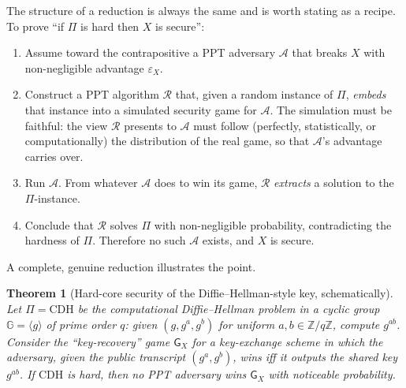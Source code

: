 \documentclass[11pt,a4paper]{article}
\newtheorem{theorem}{Theorem}[section]
\theoremstyle{definition}
\theoremstyle{remark}
\newcommand{\Z}{\ensuremath{\mathbb{Z}}}
\begin{document}
The structure of a reduction is always the same and is worth stating as a recipe.
To prove ``if \(\Pi\) is hard then \(X\) is secure'':

\begin{enumerate}
\item Assume toward the contrapositive a PPT adversary \(\mathcal{A}\) that breaks
  \(X\) with non-negligible advantage \(\varepsilon_X\).
\item Construct a PPT algorithm \(\mathcal{R}\) that, given a random instance of
  \(\Pi\), \emph{embeds} that instance into a simulated security game for
  \(\mathcal{A}\). The simulation must be faithful: the view \(\mathcal{R}\)
  presents to \(\mathcal{A}\) must follow (perfectly, statistically, or
  computationally) the distribution of the real game, so that \(\mathcal{A}\)'s advantage
  carries over.
\item Run \(\mathcal{A}\). From whatever \(\mathcal{A}\) does to win its game,
  \(\mathcal{R}\) \emph{extracts} a solution to the \(\Pi\)-instance.
\item Conclude that \(\mathcal{R}\) solves \(\Pi\) with non-negligible
  probability, contradicting the hardness of \(\Pi\). Therefore no such
  \(\mathcal{A}\) exists, and \(X\) is secure.
\end{enumerate}

A complete, genuine reduction illustrates the point.

\begin{theorem}[Hard-core security of the Diffie--Hellman-style key, schematically]\label{model:thm:reduction-example}
Let \(\Pi = \mathrm{CDH}\) be the computational Diffie--Hellman problem in a
cyclic group \(\mathbb{G}=\langle g\rangle\) of prime order \(q\): given
\((g, g^a, g^b)\) for uniform \(a,b \in \Z/q\Z\), compute \(g^{ab}\). Consider the
``key-recovery'' game \(\mathsf{G}_X\) for a key-exchange scheme in which the
adversary, given the public transcript \((g^a, g^b)\), wins iff it outputs the
shared key \(g^{ab}\). If \(\mathrm{CDH}\) is hard, then no PPT adversary wins
\(\mathsf{G}_X\) with noticeable probability.
\end{theorem}
\end{document}
